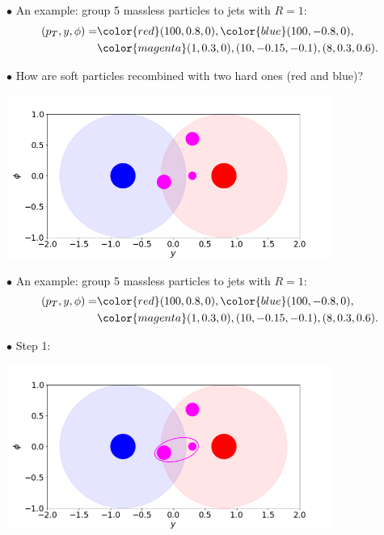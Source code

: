 \documentclass[9pt,a4paper,unknownkeysallowed,xcolor=dvipsnames,aspectratio=43]{beamer}
\begin{document}
\begin{frame}\vspace{2mm}

{\color{darkred}\Large$\bullet$} An example: group 5 massless particles to jets with $R=1$:
\begin{align}
(p_T, y, \phi) = &{\color{red}(100, 0.8, 0)}, {\color{blue}(100, -0.8, 0)},\notag\\
&{\color{magenta}(1, 0.3, 0), (10, -0.15, -0.1), (8, 0.3, 0.6)}.\notag
\end{align}

{\color{darkred}\Large$\bullet$} How are {\color{magenta}soft particles} recombined with two hard ones ({\color{red}red} and {\color{blue}blue})?
\vspace{2mm}
\begin{center}
\includegraphics[width=0.8\textwidth]{kt0.png}
\end{center}
\end{frame}
%
%
\begin{frame}\vspace{2mm}

{\color{darkred}\Large$\bullet$} An example: group 5 massless particles to jets with $R=1$:
\begin{align}
(p_T, y, \phi) = &{\color{red}(100, 0.8, 0)}, {\color{blue}(100, -0.8, 0)},\notag\\
&{\color{magenta}(1, 0.3, 0), (10, -0.15, -0.1), (8, 0.3, 0.6)}.\notag
\end{align}

{\color{darkred}\Large$\bullet$} Step 1:
\vspace{2mm}
\begin{center}
\includegraphics[width=0.8\textwidth]{kt01.png}
\end{center}
\end{frame}
\end{document}
